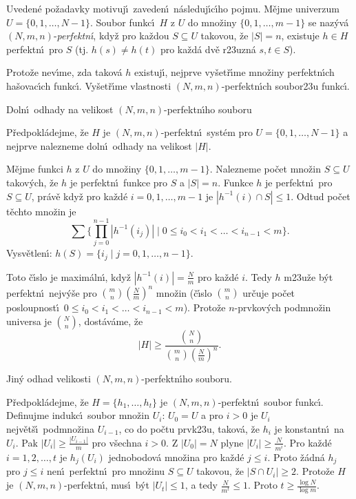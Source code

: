 \documentclass[a4paper,12pt]{article}
\begin{document}
\flushpar Uveden\'e po\v zadavky motivuj\'\i\ zaveden\'\i\ 
n\'asleduj\'\i c\'\i ho pojmu.\newline 
M\v ejme univerzum $U=\{0,1,\dots,N-1\}$. Soubor funkc\'\i\ $H$ z 
$U$ do mno\v ziny $\{0,1,\dots,m-1\}$ se naz\'yv\'a 
$(N,m,n)$-\emph{perfektn\'\i}, kdy\v z pro ka\v zdou $S\subseteq 
U$ 
takovou, \v ze $|S|=n$, existuje $h\in H$ perfektn\'\i\ pro $S$ (tj. 
$h(s)\ne h(t)$ pro ka\v zd\'a dv\v e r\accent23uzn\'a $s,t\in S$).

\flushpar Proto\v ze nev\'\i me, zda takov\'a $h$ existuj\'\i , nejprve 
vy\v set\v r\'\i me mno\-\v zi\-ny perfektn\'\i ch ha\v sovac\'\i ch 
funkc\'\i . Vy\v set\v r\'\i me vlastnosti $(N,m,n)$-perfektn\'\i ch 
soubor\accent23u funkc\'\i .
\medskip

\subhead
Doln\'\i\ odhady na velikost $(N,m,n)$-perfektn\'\i ho souboru
\endsubhead
\smallskip

\flushpar P\v redpokl\'adejme, \v ze $H$  je $(N,m,n)$-perfektn\'\i\ 
syst\'em pro $U=\{0,1,\dots,N-1\}$ a nejprve nalezneme doln\'\i\ 
odhady na velikost $|H|$.
\medskip

\flushpar M\v ejme funkci $h$ z $U$ do mno\v ziny $\{0,1,\dots,m-
1\}$. 
Nalezneme po\v cet mno\v zin $S\subseteq U$ takov\'ych, \v ze  
$h$ je perfektn\'\i\ funkce pro $S$ a $|S|=n$. Funkce $h$ je perfektn\'\i\ pro 
$S\subseteq U$, pr\'av\v e kdy\v z pro ka\v zd\'e $i=0,1,\dots,m-
1$ je 
$|h^{-1}(i)\cap S|\le 1$. Odtud po\v cet t\v echto mno\v zin je
$$\sum \{\prod_{j=0}^{n-1}|h^{-1}(i_j)|\mid 0\le i_0<i_1<\dots<i_{
n-1}<m\}.$$
\flushpar Vysv\v etlen\'\i : $h(S)=\{i_j\mid j=0,1,\dots,n-1\}$.
\medskip

\flushpar Toto \v c\'\i slo je maxim\'aln\'\i , kdy\v z $|h^{-1}(
i)|=\frac Nm$ pro ka\v zd\'e $i$. 
Tedy $h$ m\accent23u\v ze b\'yt perfektn\'\i\ nejv\'y\v se pro $\binom 
mn(\frac Nm)^n$ 
mno\v zin (\v c\'\i slo $\binom mn$ ur\v cuje po\v cet posloupnost\'\i\ 
$0\le i_0<i_1<\dots<i_{n-1}<m$). Proto\v ze $n$-prvkov\'ych 
podmno\v zin universa je $\binom Nn$, dost\'av\'ame, \v ze 
$$|H|\ge\frac {\binom Nn}{\binom mn(\frac Nm)^n}.$$

\flushpar Jin\'y odhad velikosti $(N,m,n)$-perfektn\'\i ho souboru.
\medskip

\flushpar P\v redpokl\'adejme, \v ze $H=\{h_1,\dots,h_t\}$ je 
$(N,m,n)$-perfektn\'\i\ soubor funkc\'\i .  Definujme indukc\'\i\ 
soubor mno\v zin $U_i$:\newline 
$U_0=U$ a pro 
$i>0$ je $U_i$ nejv\v et\v s\'\i\ podmno\v zina $U_{i-1}$, co do po\v ctu 
prvk\accent23u, 
takov\'a, \v ze $h_i$ je konstantn\'\i\ na $U_i$.  Pak $|U_i|\ge\frac {
|U_{i-1}|}m$ 
pro v\v sechna $i>0$.  Z $|U_0|=N$ plyne $|U_i|\ge\frac N{m^i}$.  Pro ka\v zd\'e 
$i=1,2,\dots,t$ je $h_j(U_i)$ jednobodov\'a mno\v zina pro ka\v zd\'e 
$j\le i$.  Proto \v z\'adn\'a $h_j$ pro $j\le i$ nen\'\i\ perfektn\'\i\ pro 
mno\v zinu $S\subseteq U$ takovou, \v ze $|S\cap U_i|\ge 2$.  Proto\v ze $
H$ je 
$(N,m,n)$-perfektn\'\i , mus\'\i\ b\'yt $|U_t|\le 1$, a tedy $\frac 
N{m^t}\le 1$.  Proto 
$t\ge\frac {\log N}{\log m}$.    
\medskip
\end{document}
